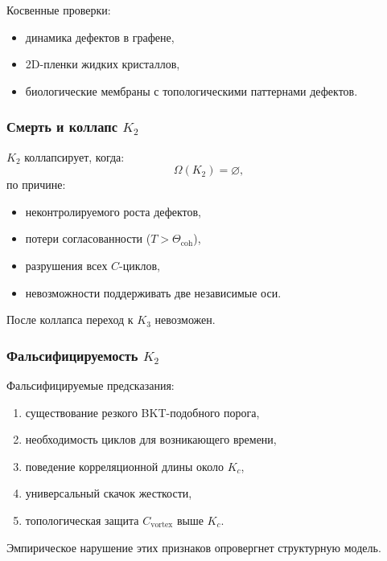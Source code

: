Косвенные проверки:
\begin{itemize}
    \item динамика дефектов в графене,
    \item 2D-пленки жидких кристаллов,
    \item биологические мембраны с топологическими паттернами дефектов.
\end{itemize}

\subsubsection{Смерть и коллапс \texorpdfstring{$K_2$}{K_2}}

$K_2$ коллапсирует, когда:
\[
\Omega(K_2) = \varnothing,
\]
по причине:
\begin{itemize}
    \item неконтролируемого роста дефектов,
    \item потери согласованности ($T > \Theta_{\mathrm{coh}}$),
    \item разрушения всех $C$-циклов,
    \item невозможности поддерживать две независимые оси.
\end{itemize}

После коллапса переход к $K_3$ невозможен.

\subsubsection{Фальсифицируемость \texorpdfstring{$K_2$}{K_2}}

Фальсифицируемые предсказания:
\begin{enumerate}
    \item существование резкого BKT-подобного порога,
    \item необходимость циклов для возникающего времени,
    \item поведение корреляционной длины около $K_c$,
    \item универсальный скачок жесткости,
    \item топологическая защита $C_{\mathrm{vortex}}$ выше $K_c$.
\end{enumerate}

Эмпирическое нарушение этих признаков опровергнет структурную
модель.

